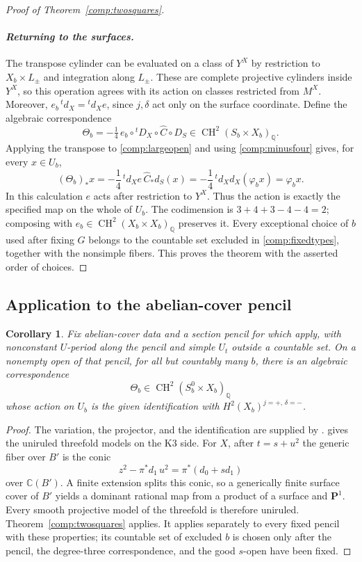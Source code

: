 \documentclass[11pt]{amsart}
\newcommand{\Q}{\mathbb Q}
\newcommand{\C}{\mathbb C}
\newcommand{\PP}{\mathbf P}
\DeclareMathOperator{\CH}{CH}
\newtheorem{corollary}[theorem]{Corollary}
\theoremstyle{definition}
\theoremstyle{remark}
\numberwithin{equation}{section}
\begin{document}
\begin{proof}[Proof of Theorem~\ref{comp:twosquares}]
\paragraph{\emph{Returning to the surfaces.}}
The transpose cylinder can be evaluated on a class of $Y^X$ by
restriction to $X_b\times L_\pm$ and integration along $L_\pm$.
These are complete projective cylinders inside $Y^X$, so this operation
agrees with its action on classes restricted from $M^X$.
Moreover,
$e_b\,{}^td_X={}^td_X e$, since $j,\delta$ act only on the surface
coordinate.  Define the algebraic correspondence
\begin{equation}\label{comp:theta}
 \Theta_b=-\tfrac14\,e_b\circ{}^tD_X\circ\widehat C\circ D_S
 \in\CH^2(S_b\times X_b)_\Q.
\end{equation}
Applying the transpose to \eqref{comp:largeopen} and using
\eqref{comp:minusfour} gives, for every $x\in U_b$,
\[
 (\Theta_b)_*x
 =-\frac14\,{}^td_X e\,\widehat C_*d_S(x)
 =-\frac14\,{}^td_Xd_X(\varphi_bx)
 =\varphi_bx.
\]
In this calculation $e$ acts after restriction to $Y^X$.
Thus the action is exactly the specified map on the whole of $U_b$.
The codimension is $3+4+3-4-4=2$; composing with
$e_b\in\CH^2(X_b\times X_b)_\Q$ preserves it.
Every exceptional choice of $b$ used after fixing $G$ belongs to the countable set excluded
in \eqref{comp:fixedtypes}, together with the nonsimple fibers.  This
proves the theorem with the asserted order of choices.
\end{proof}

\subsection{Application to the abelian-cover pencil}

\begin{corollary}\label{comp:surface}
Fix abelian-cover data and a section pencil for which
 apply, with nonconstant $U$-period along
the pencil and simple $U_t$ outside a countable set.  On a nonempty open
of that pencil, for all but countably many $b$, there is an algebraic
correspondence
\[
 \Theta_b\in\CH^2(S_b^0\times X_b)_\Q
\]
whose action on $U_b$ is the given identification with
$H^2(X_b)^{j=+,\,\delta=-}$.
\end{corollary}

\begin{proof}
The variation, the projector, and the identification are supplied by
.
 gives the uniruled threefold models on the K3 side.
For $X$, after $t=s+u^2$ the generic fiber over $B'$ is the conic
\[
 z^2-\pi^*d_1\,u^2=\pi^*(d_0+s d_1)
\]
over $\C(B')$.  A finite extension splits this conic, so a generically
finite surface cover of $B'$ yields a dominant rational map from a
product of a surface and $\PP^1$.  Every smooth projective model of the
threefold is therefore uniruled.  Theorem~\ref{comp:twosquares} applies.
It applies separately to every fixed pencil with these properties; its
countable set of excluded $b$ is chosen only after the pencil, the
degree-three correspondence, and the good $s$-open have been fixed.
\end{proof}
\end{document}
